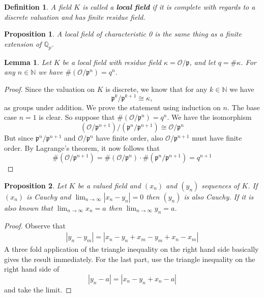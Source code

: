 \documentclass{article}
\newtheorem{definition}{Definition}[section]
\newtheorem{proposition}{Proposition}[section]
\newtheorem{lemma}{Lemma}[section]
\newcommand{\mfrak}[1]{\mathfrak{#1}}
\newcommand{\mcal}[1]{\mathcal{#1}}
\newcommand{\mbb}[1]{\mathbb{#1}}
\begin{document}
\begin{definition}
    A field $K$ is called a \textbf{local field} if it is complete with regards to a discrete valuation and has finite residue field.
\end{definition}

\begin{proposition}
    A local field of characteristic 0 is the same thing as a finite extension of $\mbb Q_p$.
\end{proposition}

\begin{lemma}\label{lem: Valuation ring mod power of prime is finite in local field}
    Let $K$ be a local field with residue field $\kappa = \mcal O / \mfrak p$, and let $q = \# \kappa$. For any $n \in \mbb N$ we have $\# (\mcal O / \mfrak p^n) = q^n$.
\end{lemma}

\begin{proof}
    Since the valuation on $K$ is discrete, we know that for any $k \in \mbb N$ we have $$\mfrak p^k / \mfrak p^{k+1} \cong \kappa,$$
    as groups under addition. We prove the statement using induction on $n$. The base case $n = 1$ is clear. So suppose that $\# (\mcal O / \mfrak p^n) = q^n$. We have the isomorphism
    $$(\mcal O / \mfrak p^{n+1}) / (\mfrak p^n / \mfrak p^{n+1}) \cong \mcal O / \mfrak p^{n}$$
    But since $\mfrak p^n / \mfrak p^{n+1}$ and $\mcal O / \mfrak p^{n}$ have finite order, also $\mcal O / \mfrak p^{n+1}$ must have finite order. By Lagrange's theorem, it now follows that $$\# (\mcal O / \mfrak p^{n+1}) = \# (\mcal O / \mfrak p^{n}) \cdot \# (\mfrak p^n / \mfrak p^{n+1}) = q^{n+1}$$
\end{proof}


\begin{proposition}
    Let $K$ be a valued field and $(x_n)$ and $(y_n)$ sequences of $K$. If $(x_n)$ is Cauchy and $\lim_{n \to \infty} |x_n - y_n| = 0$ then $(y_n)$ is also Cauchy. If it is also known that $\lim_{n \to \infty} x_n = a$ then $\lim_{n \to \infty} y_n = a$.
\end{proposition}

\begin{proof}
    Observe that
    \begin{align}
        |y_n - y_m| = |x_n - y_n + x_m - y_m + x_n - x_m|
    \end{align}
    A three fold application of the triangle inequality on the right hand side basically gives the result immediately. For the last part, use the triangle inequality on the right hand side of
    $$|y_n - a| = |x_n - y_n + x_n - a|$$ 
    and take the limit.
\end{proof}
\end{document}
